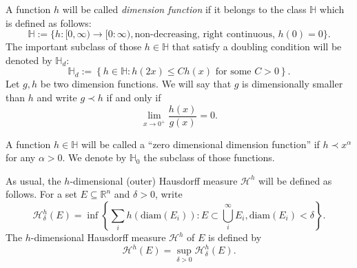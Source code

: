 \documentclass[11pt,a4paper]{amsart}
\begin{document}
\begin{definition}\label{def:dimfunc}
A function $h$ will be called \textit{dimension function} if it
belongs to the  class $\mathbb{H}$ which is defined as follows:
\begin{equation*}
 \mathbb{H}:=\{h:[0,\infty)\to[0:\infty),
 \text{non-decreasing, right continuous, }
h(0)=0 \}.
\end{equation*}
The important subclass of those $h\in\mathbb{H}$ that satisfy a doubling condition will be denoted by $\mathbb{H}_d$:
\begin{equation}
	\mathbb{H}_d:=\left\{h\in\mathbb{H}: h(2x)\le C h(x) \text{ for some }C>0\right\}.\nonumber
\end{equation} 
Let $g,h$ be two dimension functions. We will say that $g$ is
dimensionally smaller than $h$ and write $g\prec h $ if and only
if
    \begin{equation*}
    \lim_{x\to 0^+}\dfrac{h(x)}{g(x)}=0.
    \end{equation*}

A function $h\in{\mathbb{H}}$ will be called a ``zero dimensional dimension
function'' if $h\prec x^\alpha$ for any $\alpha>0$. We denote by
$\mathbb{H}_0$ the subclass of those functions.

As usual, the $h$-dimensional (outer) Hausdorff  measure ${\mathcal{H}^{{h}}}$
will be defined as follows. For a set $E\subseteq{\mathbb{R}}^n$ and
$\delta>0$, write
\begin{equation*}
    {\mathcal{H}_{\delta}^{{h}}}(E)=\inf\left\{\sum_i h({\text{diam}}(E_i)):E\subset\bigcup_i^\infty E_i,  {\text{diam}}(E_i)<\delta \right\}.
\end{equation*}
The $h$-dimensional Hausdorff measure ${\mathcal{H}^{{h}}}$ of $E$ is defined
by
\begin{equation*}
    {\mathcal{H}^{{h}}}(E)=\sup_{\delta>0 }{\mathcal{H}_{\delta}^{{h}}}(E). \label{eq:h-meas}
\end{equation*}
\end{definition}
\end{document}

